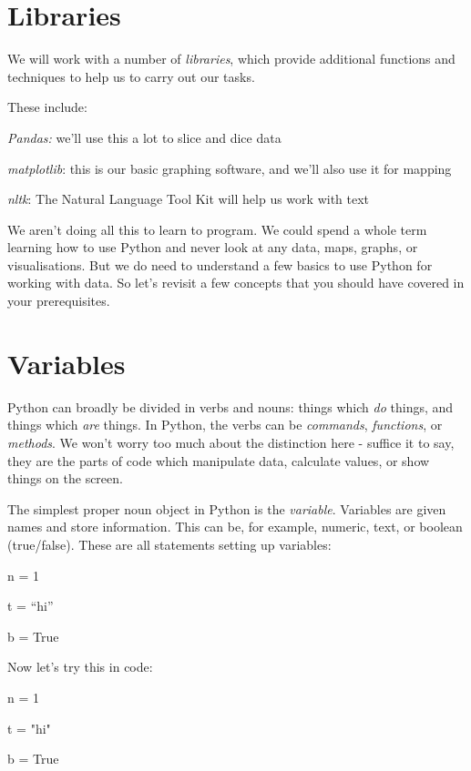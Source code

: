 \documentclass[
  letterpaper,
  DIV=11,
  numbers=noendperiod]{scrreprt}
\newenvironment{Shaded}{\begin{snugshade}}{\end{snugshade}}
\newcommand{\DecValTok}[1]{\textcolor[rgb]{0.68,0.00,0.00}{#1}}
\newcommand{\NormalTok}[1]{\textcolor[rgb]{0.00,0.23,0.31}{#1}}
\newcommand{\OperatorTok}[1]{\textcolor[rgb]{0.37,0.37,0.37}{#1}}
\newcommand{\StringTok}[1]{\textcolor[rgb]{0.13,0.47,0.30}{#1}}
\newcommand{\VariableTok}[1]{\textcolor[rgb]{0.07,0.07,0.07}{#1}}
\begin{document}
\hypertarget{libraries}{%
\section{Libraries}\label{libraries}}

We will work with a number of \emph{libraries}, which provide additional
functions and techniques to help us to carry out our tasks.

These include:

\emph{Pandas:} we'll use this a lot to slice and dice data

\emph{matplotlib}: this is our basic graphing software, and we'll also
use it for mapping

\emph{nltk}: The Natural Language Tool Kit will help us work with text

We aren't doing all this to learn to program. We could spend a whole
term learning how to use Python and never look at any data, maps,
graphs, or visualisations. But we do need to understand a few basics to
use Python for working with data. So let's revisit a few concepts that
you should have covered in your prerequisites.

\hypertarget{variables}{%
\section{Variables}\label{variables}}

Python can broadly be divided in verbs and nouns: things which \emph{do}
things, and things which \emph{are} things. In Python, the verbs can be
\emph{commands}, \emph{functions}, or \emph{methods}. We won't worry too
much about the distinction here - suffice it to say, they are the parts
of code which manipulate data, calculate values, or show things on the
screen.

The simplest proper noun object in Python is the \emph{variable}.
Variables are given names and store information. This can be, for
example, numeric, text, or boolean (true/false). These are all
statements setting up variables:

n = 1

t = ``hi''

b = True

Now let's try this in code:

\begin{Shaded}
\begin{Highlighting}[]
\NormalTok{n }\OperatorTok{=} \DecValTok{1}

\NormalTok{t }\OperatorTok{=} \StringTok{"hi"}

\NormalTok{b }\OperatorTok{=} \VariableTok{True}
\end{Highlighting}
\end{Shaded}
\end{document}
